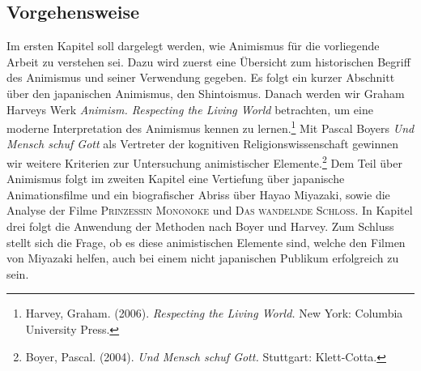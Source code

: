 \subsection*{Vorgehensweise}
Im ersten Kapitel soll dargelegt werden, wie Animismus für die vorliegende Arbeit zu verstehen sei. Dazu wird zuerst eine Übersicht zum historischen Begriff des Animismus und seiner Verwendung gegeben. Es folgt ein kurzer Abschnitt über den japanischen Animismus, den Shintoismus. Danach werden wir Graham Harveys Werk \emph{Animism. Respecting the Living World} betrachten, um eine moderne Interpretation des Animismus kennen zu lernen.\footnote{Harvey, Graham. (2006). \emph{Respecting the Living World.} New York: Columbia University Press.} Mit Pascal Boyers \emph{Und Mensch schuf Gott} als Vertreter der kognitiven Religionswissenschaft gewinnen wir weitere Kriterien zur Untersuchung animistischer Elemente.\footnote{Boyer, Pascal. (2004). \emph{Und Mensch schuf Gott.} Stuttgart: Klett-Cotta.} Dem Teil über Animismus folgt im zweiten Kapitel eine Vertiefung über japanische Animationsfilme und ein biografischer Abriss über Hayao Miyazaki, sowie die Analyse der Filme \textsc{Prinzessin Mononoke} und \textsc{Das wandelnde Schloss}. In Kapitel drei folgt die Anwendung der Methoden nach Boyer und Harvey. Zum Schluss stellt sich die Frage, ob es diese animistischen Elemente sind, welche den Filmen von Miyazaki helfen, auch bei einem nicht japanischen Publikum erfolgreich zu sein.